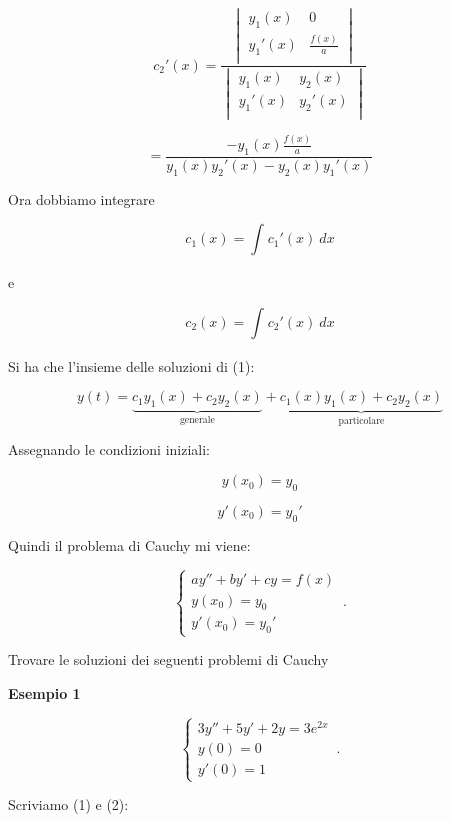 \documentclass[../appunti-analisi.tex]{subfiles}
\begin{document}
\[
c_2'(x) = 
    \frac{
\begin{vmatrix}
y_1(x) & 0  \\
y_1'(x) & \frac{f(x)}{a}  \\
\end{vmatrix}
    }{
\begin{vmatrix}
y_1(x) & y_2(x)  \\
y_1'(x) & y_2'(x)  \\
\end{vmatrix}
    }
\]

\[
    = \frac{- y_1(x) \frac{f(x)}{a}}{y_1(x) y_2'(x) - y_2(x) y_1'(x)}
\]

Ora dobbiamo integrare

\[
    c_1(x) = \int_{}^{} {c_1'(x)} \: dx 
\]

e

\[
    c_2(x) = \int_{}^{} {c_2'(x)} \: dx 
\]

Si ha che l'insieme delle soluzioni di (1):

\[
    y(t)  = \underbrace{c_1 y_1(x) + c_2 y_2(x)}_\text{generale} + \underbrace{c_1(x) y_1(x) + c_2 y_2(x)}_\text{particolare}
\]

Assegnando le condizioni iniziali: 

\[
    y(x_0) = y_0
\]

\[
    y'(x_0) = y_0'
\]

Quindi il problema di Cauchy mi viene:

    \begin{equation}
        \begin{cases}
            ay''+ by'+cy= f(x)\\
            y(x_0)=y_0\\
            y'(x_0) = y_0'
        \end{cases}\,.
    \end{equation}

Trovare le soluzioni dei seguenti problemi di Cauchy

\textbf{Esempio 1} 

    \begin{equation}
        \begin{cases}
            3y'' + 5y' + 2y=3e ^{2x}\\
            y(0) = 0\\
            y'(0) = 1
        \end{cases}\,.
    \end{equation}

Scriviamo (1) e (2):
\end{document}
